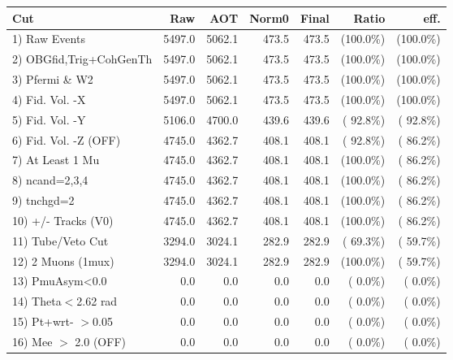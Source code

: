  \begin{table}[h!]\centering
 \begin{tabular}{||l||r|r|r|r|r|r||}
 \hline
 \hline
 Cut & Raw & AOT & Norm0 & Final & Ratio & eff.       \\
 \hline
  1) Raw Events           &       5497.0 &       5062.1 &        473.5 &        473.5 & (100.0\%) & (100.0\%) \\
  2) OBGfid,Trig+CohGenTh &       5497.0 &       5062.1 &        473.5 &        473.5 & (100.0\%) & (100.0\%) \\
  3) Pfermi \& W2         &       5497.0 &       5062.1 &        473.5 &        473.5 & (100.0\%) & (100.0\%) \\
  4) Fid. Vol. -X         &       5497.0 &       5062.1 &        473.5 &        473.5 & (100.0\%) & (100.0\%) \\
  5) Fid. Vol. -Y         &       5106.0 &       4700.0 &        439.6 &        439.6 & ( 92.8\%) & ( 92.8\%) \\
  6) Fid. Vol. -Z (OFF)   &       4745.0 &       4362.7 &        408.1 &        408.1 & ( 92.8\%) & ( 86.2\%) \\
  7) At Least 1 Mu        &       4745.0 &       4362.7 &        408.1 &        408.1 & (100.0\%) & ( 86.2\%) \\
  8) ncand=2,3,4          &       4745.0 &       4362.7 &        408.1 &        408.1 & (100.0\%) & ( 86.2\%) \\
  9) tnchgd=2             &       4745.0 &       4362.7 &        408.1 &        408.1 & (100.0\%) & ( 86.2\%) \\
 10) +/- Tracks (V0)      &       4745.0 &       4362.7 &        408.1 &        408.1 & (100.0\%) & ( 86.2\%) \\
 11) Tube/Veto Cut        &       3294.0 &       3024.1 &        282.9 &        282.9 & ( 69.3\%) & ( 59.7\%) \\
 12) 2 Muons (1mux)       &       3294.0 &       3024.1 &        282.9 &        282.9 & (100.0\%) & ( 59.7\%) \\
 13) PmuAsym<0.0          &          0.0 &          0.0 &          0.0 &          0.0 & (  0.0\%) & (  0.0\%) \\
 14) Theta$<$2.62 rad     &          0.0 &          0.0 &          0.0 &          0.0 & (  0.0\%) & (  0.0\%) \\
 15) Pt+wrt- $>$0.05      &          0.0 &          0.0 &          0.0 &          0.0 & (  0.0\%) & (  0.0\%) \\
 16) Mee $>$ 2.0  (OFF)   &          0.0 &          0.0 &          0.0 &          0.0 & (  0.0\%) & (  0.0\%) \\

\end{tabular}
\end{table}
